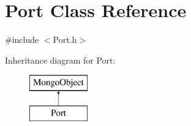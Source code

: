 \hypertarget{class_port}{}\section{Port Class Reference}
\label{class_port}


{\ttfamily \#include $<$Port.\+h$>$}

Inheritance diagram for Port\+:\begin{figure}[H]
\begin{center}
\leavevmode
\includegraphics[height=2.000000cm]{class_port}
\end{center}
\end{figure}
